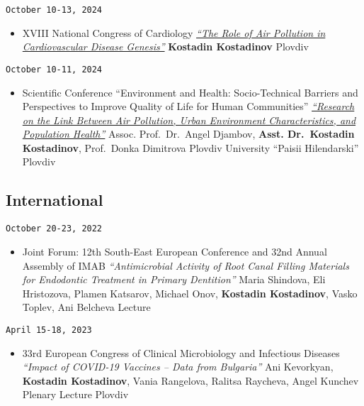 \documentclass[
  12pt,
  letterpaper,
  DIV=11,
  numbers=noendperiod]{scrartcl}
\providecommand{\tightlist}{%
  \setlength{\itemsep}{0pt}\setlength{\parskip}{0pt}}\usepackage{longtable,booktabs,array}
\begin{document}
\texttt{October\ 10-13,\ 2024}

\begin{itemize}
\tightlist
\item
  XVIII National Congress of Cardiology \textbar{}
  \href{https://www.bgcardio.org/storage/app/media/uploaded-files/XVIII\%20Congress\%20program_web.pdf}{\emph{``The
  Role of Air Pollution in Cardiovascular Disease Genesis''}} \textbar{}
  \textbf{Kostadin Kostadinov} \textbar{} Plovdiv
\end{itemize}

\texttt{October\ 10-11,\ 2024}

\begin{itemize}
\tightlist
\item
  Scientific Conference ``Environment and Health: Socio-Technical
  Barriers and Perspectives to Improve Quality of Life for Human
  Communities'' \textbar{}
  \href{https://hiddeneurope-jeanmonnet.uni-plovdiv.net/2024/10/\%d0\%bf\%d1\%80\%d0\%be\%d0\%b3\%d1\%80\%d0\%b0\%d0\%bc\%d0\%b0-\%d0\%bd\%d0\%b0-\%d0\%bd\%d0\%b0\%d1\%83\%d1\%87\%d0\%bd\%d0\%b0\%d1\%82\%d0\%b0-\%d0\%ba\%d0\%be\%d0\%bd\%d1\%84\%d0\%b5\%d1\%80\%d0\%b5\%d0\%bd\%d1\%86\%d0\%b8\%d1\%8f-\%d0\%be\%d0\%ba/}{\emph{``Research
  on the Link Between Air Pollution, Urban Environment Characteristics,
  and Population Health''}} \textbar{} Assoc. Prof.~Dr.~Angel Djambov,
  \textbf{Asst. Dr.~Kostadin Kostadinov}, Prof.~Donka Dimitrova
  \textbar{} Plovdiv University ``Paisii Hilendarski'' \textbar{}
  Plovdiv
\end{itemize}

\subsection{International}\label{international-1}

\texttt{October\ 20-23,\ 2022}

\begin{itemize}
\tightlist
\item
  Joint Forum: 12th South-East European Conference and 32nd Annual
  Assembly of IMAB \textbar{} \emph{``Antimicrobial Activity of Root
  Canal Filling Materials for Endodontic Treatment in Primary
  Dentition''} \textbar{} Maria Shindova, Eli Hristozova, Plamen
  Katsarov, Michael Onov, \textbf{Kostadin Kostadinov}, Vasko Toplev,
  Ani Belcheva \textbar{} Lecture
\end{itemize}

\texttt{April\ 15-18,\ 2023}

\begin{itemize}
\tightlist
\item
  33rd European Congress of Clinical Microbiology and Infectious
  Diseases \textbar{} \emph{``Impact of COVID-19 Vaccines -- Data from
  Bulgaria''} \textbar{} Ani Kevorkyan, \textbf{Kostadin Kostadinov},
  Vania Rangelova, Ralitsa Raycheva, Angel Kunchev \textbar{} Plenary
  Lecture \textbar{} Plovdiv
\end{itemize}
\end{document}
